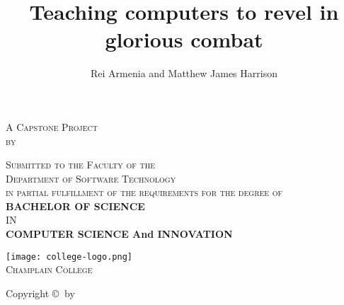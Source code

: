 
\title{Teaching computers to revel in glorious combat} %
\author{Rei Armenia and Matthew James Harrison} %

\makeatletter
\let\thetitle\@title
\let\theauthors\@author
\makeatother

{
	\centering
    {\Huge\textsc{\thetitle}\unskip\strut\par}
	\vspace{1 in}
    \textsc{
      A Capstone Project \\
      by \\
    }
    {\bfseries \textsc{\theauthors} \unskip\strut\par}
    \vspace{1 in}
  	\textsc{
    	Submitted to the Faculty of the \\
		Department of Software Technology \\
		in partial fulfillment of the requirements for the degree of \\
	}
    \vspace{0.5 in}
    {\bfseries BACHELOR OF SCIENCE \\}
    IN \\
    {\bfseries COMPUTER SCIENCE And INNOVATION}

    \vspace{1 in}
   	\texttt{[image: college-logo.png]} \\
    \textsc{\large Champlain College \\}
    \the\year

    \newpage
    \vspace*{\fill}
    Copyright \copyright $~$ by \theauthors \\ \the\year
    \vspace*{\fill}   
    
}
